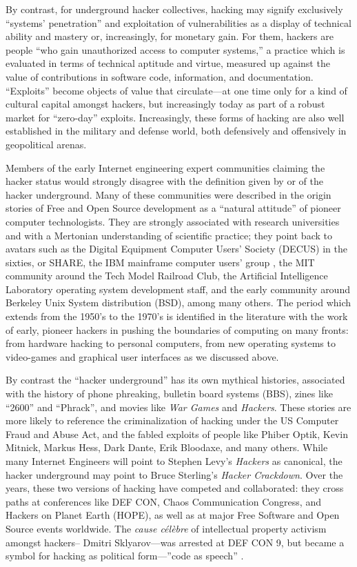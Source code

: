 \documentclass[10pt,letter,oneside]{scrartcl}
\begin{document}
By contrast, for underground hacker collectives, hacking may signify exclusively
``systems' penetration'' and exploitation of vulnerabilities as a display of
technical ability and mastery or, increasingly, for monetary gain.  For them,
hackers are people ``who gain unauthorized access to computer systems,'' a
practice which is evaluated in terms of technical aptitude and virtue, measured
up against the value of contributions in software code, information, and
documentation.  ``Exploits'' become objects of value that circulate---at one
time only for a kind of cultural capital amongst hackers, but increasingly today
as part of a robust market for ``zero-day'' exploits.  Increasingly, these forms
of hacking are also well established in the military and defense world, both
defensively and offensively in geopolitical arenas.

Members of the early Internet engineering expert communities claiming the hacker
status would strongly disagree with the definition given by or of the hacker
underground. Many of these communities were described in the origin stories of
Free and Open Source development as a ``natural attitude'' of pioneer computer
technologists.  They are strongly associated with research universities and with
a Mertonian understanding of scientific practice; they point back to avatars
such as the Digital Equipment Computer Users' Society (DECUS) in the sixties, or
SHARE, the IBM mainframe computer users' group \parencite{akera2001voluntarism},
the MIT community around the Tech Model Railroad Club, the Artificial
Intelligence Laboratory operating system development staff, and the early
community around Berkeley Unix System distribution (BSD), among many others.
The period which extends from the 1950's to the 1970's is identified in the
literature with the work of early, pioneer hackers in pushing the boundaries of
computing on many fronts: from hardware hacking to personal computers, from new
operating systems to video-games and graphical user interfaces as we discussed
above.

By contrast the ``hacker underground'' has its own mythical histories,
associated with the history of phone phreaking, bulletin board systems (BBS),
zines like ``2600'' and ``Phrack'', and movies like \emph{War Games} and
\emph{Hackers}.  These stories are more likely to reference the criminalization
of hacking under the US Computer Fraud and Abuse Act, and the fabled exploits
of people like Phiber Optik, Kevin Mitnick, Markus Hess, Dark Dante, Erik 
Bloodaxe, and many others.  While many Internet Engineers will point to 
Stephen Levy's \emph{Hackers} as canonical, the hacker underground may point to 
Bruce Sterling's \emph{Hacker Crackdown}.  Over the years, these two versions of
hacking have competed and collaborated: they cross paths at conferences like
DEF CON, Chaos Communication Congress, and Hackers on Planet Earth (HOPE), as 
well as at major Free Software and Open Source events worldwide.  The 
\emph{cause célèbre} of intellectual property activism amongst hackers--
Dmitri Sklyarov---was arrested at DEF CON 9, but became a symbol for 
hacking as political form---''code as speech'' \parencite{coleman_code_2009}. 
\end{document}
